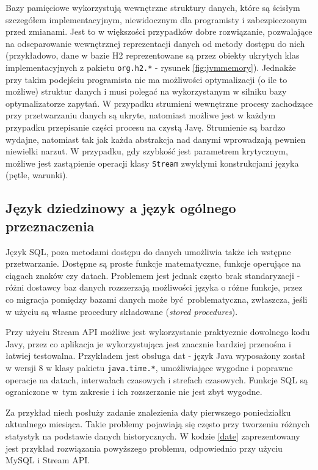 \documentclass[12pt,twoside,openright]{extarticle}
\begin{document}
    Bazy pamięciowe wykorzystują wewnętrzne struktury danych, które są ścisłym szczegółem implementacyjnym, niewidocznym dla programisty i zabezpieczonym przed zmianami. Jest to w większości przypadków dobre rozwiązanie, pozwalające na odseparowanie wewnętrznej reprezentacji danych od metody dostępu do nich (przykładowo, dane w bazie H2 reprezentowane są przez obiekty ukrytych klas implementacyjnych z pakietu \texttt{org.h2.*} - rysunek \ref{fig:jvmmemory}). Jednakże przy takim podejściu programista nie ma możliwości optymalizacji (o ile to możliwe) struktur danych i musi polegać na wykorzystanym w silniku bazy optymalizatorze zapytań. W przypadku strumieni wewnętrzne procesy zachodzące przy przetwarzaniu danych są ukryte, natomiast możliwe jest w każdym przypadku przepisanie części procesu na czystą Javę. Strumienie są bardzo wydajne, natomiast tak jak każda abstrakcja nad danymi wprowadzają pewnien niewielki narzut. W przypadku, gdy szybkość jest parametrem krytycznym, możliwe jest zastąpienie operacji klasy \texttt{Stream} zwykłymi konstrukcjami języka (pętle, warunki). 

\subsection{Język dziedzinowy a język ogólnego przeznaczenia}

    Język SQL, poza metodami dostępu do danych umożliwia także ich wstępne przetwarzanie. Dostępne są proste funkcje matematyczne, funkcje operujące na ciągach znaków czy datach. Problemem jest jednak często brak standaryzacji - różni dostawcy baz danych rozszerzają możliwości języka o różne funkcje, przez co migracja pomiędzy bazami danych może być problematyczna, zwłaszcza, jeśli w użyciu są własne procedury składowane (\textit{stored procedures}). 
   
    Przy użyciu Stream API możliwe jest wykorzystanie praktycznie dowolnego kodu Javy, przez co aplikacja je wykorzystująca jest znacznie bardziej przenośna i łatwiej testowalna. Przykładem jest obsługa dat - język Java wyposażony został w wersji 8 w klasy pakietu \texttt{java.time.*}, umożliwiające wygodne i poprawne operacje na datach, interwałach czasowych i strefach czasowych. Funkcje SQL są ograniczone w~tym zakresie i ich rozszerzanie nie jest zbyt wygodne.

    Za przykład niech posłuży zadanie znalezienia daty pierwszego poniedziałku aktualnego miesiąca. Takie problemy pojawiają się często przy tworzeniu różnych statystyk na podstawie danych historycznych. W kodzie \ref{date} zaprezentowany jest przykład rozwiązania powyższego problemu, odpowiednio przy użyciu MySQL i Stream API.
    
\end{document}
